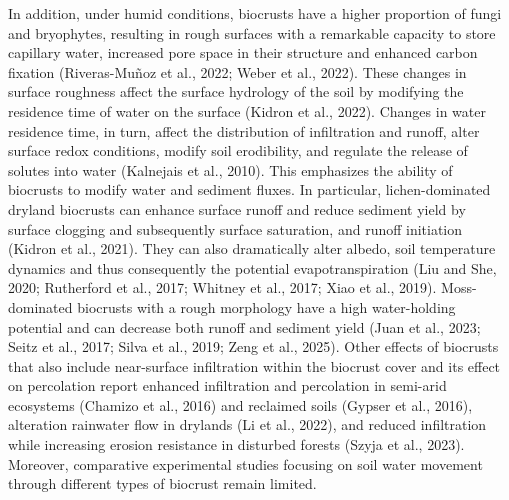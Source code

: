 In addition, under humid conditions, biocrusts have a higher proportion of fungi and bryophytes, resulting in rough surfaces with a remarkable capacity to store capillary water, increased pore space in their structure and enhanced carbon fixation (Riveras-Muñoz et al., 2022; Weber et al., 2022). These changes in surface roughness affect the surface hydrology of the soil by modifying the residence time of water on the surface (Kidron et al., 2022). Changes in water residence time, in turn, affect the distribution of infiltration and runoff, alter surface redox conditions, modify soil erodibility, and regulate the release of solutes into water (Kalnejais et al., 2010). This emphasizes the ability of biocrusts to modify water and sediment fluxes. In particular, lichen-dominated dryland biocrusts can enhance surface runoff and reduce sediment yield by surface clogging and subsequently surface saturation, and runoff initiation (Kidron et al., 2021). They can also dramatically alter albedo, soil temperature dynamics and thus consequently the potential evapotranspiration (Liu and She, 2020; Rutherford et al., 2017; Whitney et al., 2017; Xiao et al., 2019). Moss-dominated biocrusts with a rough morphology have a high water-holding potential and can decrease both runoff and sediment yield (Juan et al., 2023; Seitz et al., 2017; Silva et al., 2019; Zeng et al., 2025). Other effects of biocrusts that also include near-surface infiltration within the biocrust cover and its effect on percolation report enhanced infiltration and percolation in semi-arid ecosystems (Chamizo et al., 2016) and reclaimed soils (Gypser et al., 2016), alteration rainwater flow in drylands (Li et al., 2022), and reduced infiltration while increasing erosion resistance in disturbed forests (Szyja et al., 2023). Moreover, comparative experimental studies focusing on soil water movement through different types of biocrust remain limited.

